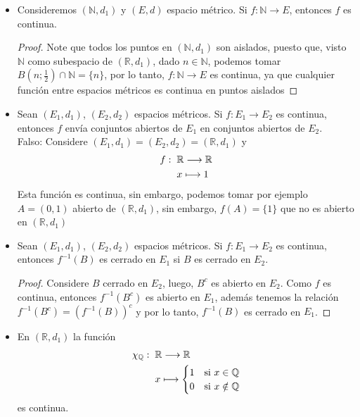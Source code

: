 \begin{itemize}[leftmargin=*]

\item Consideremos $(\mathbb{N},d_1)$ y $(E,d)$ espacio métrico. Si $f: \mathbb{N} \longrightarrow E$, entonces $f$ es continua.\\

\begin{proof}
 Note que todos los puntos en $(\mathbb{N},d_1)$ son aislados, puesto que, visto $\mathbb{N}$ como subespacio de $(\mathbb{R},d_1)$, dado $n \in \mathbb{N}$, podemos tomar $B(n;\frac{1}{2}) \cap \mathbb{N}=\{n\}$, por lo tanto, $f: \mathbb{N} \longrightarrow E$ es continua, ya que cualquier función entre espacios métricos es continua en puntos aislados
\end{proof}

\item Sean $(E_1,d_1)$, $(E_2,d_2)$ espacios métricos. Si $f: E_1 \longrightarrow E_2$ es continua, entonces $f$ envía conjuntos abiertos de $E_1$ en conjuntos abiertos de $E_2$.\\

Falso: Considere  $(E_1,d_1)=(E_2,d_2)=(\mathbb{R},d_1)$ y 
    \begin{align*}
        f: \hspace{2mm} &\mathbb{R} \longrightarrow \mathbb{R}\\
        &x \longmapsto 1 
    \end{align*}
    Esta función es continua, sin embargo, podemos tomar por ejemplo $A=(0,1)$ abierto de $(\mathbb{R},d_1)$, sin embargo, $f(A)=\{1\}$ que no es abierto en $(\mathbb{R},d_1)$

\item Sean $(E_1,d_1)$, $(E_2,d_2)$ espacios métricos. Si $f: E_1 \longrightarrow E_2$ es continua, entonces $f^{-1}(B)$ es cerrado en $E_1$ si $B$ es cerrado en $E_2$.\\

\begin{proof}
 Considere $B$ cerrado en $E_2$, luego, $B^c$ es abierto en $E_2$. Como $f$ es continua, entonces $f^{-1}(B^c)$ es abierto en $E_1$, además tenemos la relación $f^{-1}(B^c)=(f^{-1}(B))^c$ y por lo tanto, $f^{-1}(B)$ es cerrado en $E_1$.
\end{proof}

\item En $(\mathbb{R},d_1)$ la función
\begin{align*}
    \chi_\mathbb{Q}: \hspace{2mm} &\mathbb{R} \longrightarrow \mathbb{R}\\
    &x \longmapsto \begin{cases}
        1 & \text{si } x\in \mathbb{Q}\\
        0 & \text{si } x \notin \mathbb{Q}
    \end{cases}
\end{align*}
es continua.


\end{itemize}
